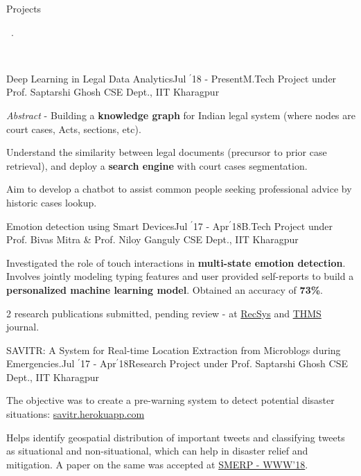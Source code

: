 \documentclass[11pt, a4paper]{resume}
\newcommand{\important}[1]{
	\textcolor{mypurple}{#1}
}
\newcommand{\fillit}[1]{
	\leavevmode\xleaders\hbox{#1}\hfill\kern0pt
}
\newcommand{\sectionSubtitleX}[1]{
	\begin{large}
    \important{#1}
    \end{large}
    \fillit{\important{.}}
}
\begin{document}
\sectionSubtitleX{Projects}
\\
\begin{rSubsection}{Deep Learning in Legal Data Analytics}{Jul $^{\prime}$18 - Present}{M.Tech Project under Prof. Saptarshi Ghosh}{\hspace*{\fill} CSE Dept., IIT Kharagpur}
\item \textit{Abstract} - Building a \textbf{knowledge graph} for Indian legal system (where nodes are court cases, Acts, sections, etc).
\item Understand the similarity between legal documents (precursor to prior case retrieval), and deploy a \textbf{search engine} with court cases segmentation.
\item Aim to develop a chatbot to assist common people seeking professional advice by historic cases lookup.
\end{rSubsection}

\begin{rSubsection}{Emotion detection using Smart Devices}{Jul $^{\prime}$17 - Apr$^{\prime}$18}{B.Tech Project under Prof. Bivas Mitra \& Prof. Niloy Ganguly}{\hspace*{\fill} CSE Dept., IIT Kharagpur}
\item Investigated the role of touch interactions in {\bf multi-state emotion detection}. Involves jointly modeling typing features and  user provided self-reports to build a {\bf personalized machine learning model}. Obtained an accuracy of {\bf 73\%}.
\item 2 research publications submitted, pending review - at \href{https://recsys.acm.org/recsys18/}{RecSys} and \href{http://www.ieeesmc.org/publications/transactions-on-human-machine-systems}{THMS} journal.
\end{rSubsection}

\begin{rSubsection}{SAVITR: A System for Real-time Location Extraction from Microblogs during Emergencies.}{Jul $^{\prime}$17 - Apr$^{\prime}$18}{Research Project under Prof. Saptarshi Ghosh}{\hspace*{\fill} CSE Dept., IIT Kharagpur}
\item The objective was to create a pre-warning system to detect potential disaster situations: \href{http://savitr.herokuapp.com}{savitr.herokuapp.com}
\item Helps identify geospatial distribution of important tweets and classifying tweets as situational and non-situational, which can help in disaster relief and mitigation. A paper on the same was accepted at \href{https://www.cse.iitk.ac.in/users/kripa/smerp2018/}{SMERP - WWW'18}.
\end{rSubsection}
\end{document}
